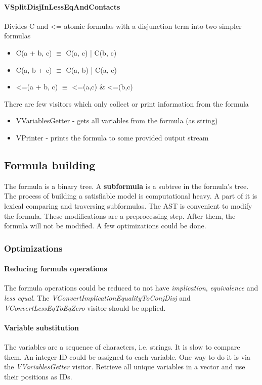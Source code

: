 \documentclass{article}
\begin{document}
	\paragraph{VSplitDisjInLessEqAndContacts}
				Divides C and <= atomic formulas with a disjunction term into two simpler formulas
				\begin{itemize}
					\item C(a + b, c) $\equiv$ C(a, c) | C(b, c)
					\item C(a, b + c) $\equiv$ C(a, b) | C(a, c)
					\item <=(a + b, c) $\equiv$ <=(a,c) \& <=(b,c)
				\end{itemize}

	There are few visitors which only collect or print information from the formula
				\begin{itemize}
					\item VVariablesGetter - gets all variables from the formula (as string)
					\item VPrinter - prints the formula to some provided output stream
				\end{itemize}

	\subsection{Formula building}
	The formula is a binary tree. A \textbf{subformula} is a subtree in the formula's tree. The process of building a satisfiable model is computational heavy. A part of it is lexical comparing and traversing subformulas. The AST is convenient to modify the formula. These modifications are a preprocessing step. After them, the formula will not be modified. A few optimizations could be done.

	\subsubsection{Optimizations}
	\paragraph{Reducing formula operations}
	The formula operations could be reduced to not have \textit{implication}, \textit{equivalence} and \textit{less equal}. The \textit{VConvertImplicationEqualityToConjDisj} and \textit{VConvertLessEqToEqZero} visitor should be applied.

	\paragraph{Variable substitution}
	The variables are a sequence of characters, i.e. strings. It is slow to compare them. An integer ID could be assigned to each variable. One way to do it is via the \textit{VVariablesGetter} visitor. Retrieve all unique variables in a vector and use their positions as IDs.
\end{document}
